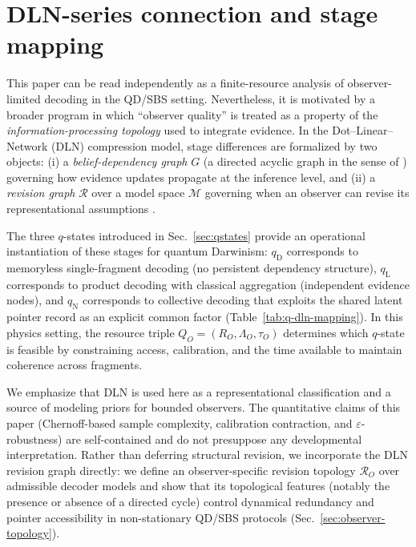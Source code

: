 \documentclass[11pt]{article}
\newcommand{\cR}{\mathcal{R}}
\newcommand{\1}{\mathbf{1}}
\theoremstyle{definition}
\theoremstyle{plain}
\begin{document}
\section{DLN-series connection and stage mapping}
\label{sec:dln-brief}

This paper can be read independently as a finite-resource analysis of observer-limited decoding in the QD/SBS setting.
Nevertheless, it is motivated by a broader program in which ``observer quality'' is treated as a property of the \emph{information-processing topology} used to integrate evidence.
In the Dot--Linear--Network (DLN) compression model, stage differences are formalized by two objects: (i) a \emph{belief-dependency graph} $G$ (a directed acyclic graph in the sense of \citet{Pearl1988}) governing how evidence updates propagate at the inference level, and (ii) a \emph{revision graph} $\mathcal{R}$ over a model space $\mathcal{M}$ governing when an observer can revise its representational assumptions \citep{WuDLNCompression2026preprint}.

The three $q$-states introduced in Sec.~\ref{sec:qstates} provide an operational instantiation of these stages for quantum Darwinism:
$q_{\mathrm{D}}$ corresponds to memoryless single-fragment decoding (no persistent dependency structure),
$q_{\mathrm{L}}$ corresponds to product decoding with classical aggregation (independent evidence nodes),
and $q_{\mathrm{N}}$ corresponds to collective decoding that exploits the shared latent pointer record as an explicit common factor (Table~\ref{tab:q-dln-mapping}).
In this physics setting, the resource triple $Q_O=(R_O,\Lambda_O,\tau_O)$ determines which $q$-state is feasible by constraining access, calibration, and the time available to maintain coherence across fragments.

We emphasize that DLN is used here as a representational classification and a source of modeling priors for bounded observers.
The quantitative claims of this paper (Chernoff-based sample complexity, calibration contraction, and $\varepsilon$-robustness) are self-contained and do not presuppose any developmental interpretation.
Rather than deferring structural revision, we incorporate the DLN revision graph directly: we define an observer-specific revision topology $\cR_O$ over admissible decoder models and show that its topological features (notably the presence or absence of a directed cycle) control dynamical redundancy and pointer accessibility in non-stationary QD/SBS protocols (Sec.~\ref{sec:observer-topology}).
\end{document}
